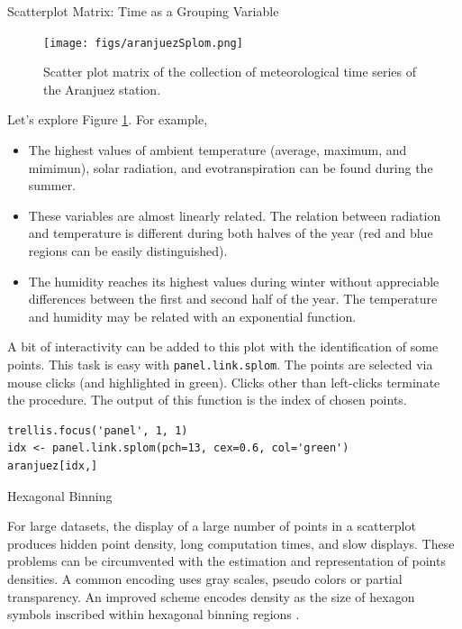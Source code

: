 \documentclass[presentation]{beamer}
\begin{document}
\begin{frame}[fragile,label=sec-1]{Scatterplot Matrix: Time as a Grouping Variable}
\begin{figure}[htb]
\centering
\texttt{[image: figs/aranjuezSplom.png]}
\caption{\label{fig:aranjuezSplom}Scatter plot matrix of the collection of meteorological time series of the Aranjuez station.}
\end{figure}


Let's explore Figure \ref{fig:aranjuezSplom}. For example,
\begin{itemize}
\item The highest values of ambient temperature (average, maximum, and
mimimun), solar radiation, and evotranspiration can be found
during the summer.
\item These variables are almost linearly related. The relation
between radiation and temperature is different during both
halves of the year (red and blue regions can be easily distinguished).
\item The humidity reaches its highest values during winter without
appreciable differences between the first and second half of the
year. The temperature and humidity may be related with an
exponential function.
\end{itemize}

A bit of interactivity can be added to this plot with the
identification of some points. This task is easy with
\texttt{panel.link.splom}. The points are selected via mouse clicks (and
highlighted in green). Clicks other than left-clicks terminate the
procedure. The output of this function is the index of chosen
points.


\lstset{language=R,numbers=none}
\begin{lstlisting}
trellis.focus('panel', 1, 1)
idx <- panel.link.splom(pch=13, cex=0.6, col='green')
aranjuez[idx,]
\end{lstlisting}


\begin{block}{Hexagonal Binning}
\hypertarget{SEC:hexbin}{}

For large datasets, the display of a large number of points in a
scatterplot produces hidden point density, long computation times,
and slow displays. These problems can be circumvented with the
estimation and representation of points densities.  A common
encoding uses gray scales, pseudo colors or partial
transparency. An improved scheme encodes density as the size of
hexagon symbols inscribed within hexagonal binning regions
\cite{Carr.Littlefield.ea1987}.


\end{block}
\end{frame}
\end{document}
